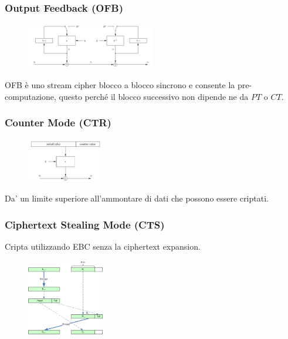 \documentclass[a4paper,12pt]{article}
\begin{document}
\subsubsection{Output Feedback (OFB)}
\begin{figure}[H]
  \centering
  \includegraphics[width=0.5\textwidth]{img/ofb}
\end{figure}
OFB è uno stream cipher blocco a blocco sincrono e consente la pre-computazione, questo perché il blocco successivo non dipende ne da $PT$ o $CT$.

\subsubsection{Counter Mode (CTR)}
\begin{figure}[H]
  \centering
  \includegraphics[width=0.3\textwidth]{img/ctr}
\end{figure}
Da' un limite superiore all'ammontare di dati che possono essere criptati.

\subsubsection{Ciphertext Stealing Mode (CTS)}
Cripta utilizzando EBC senza la ciphertext expansion.
\begin{figure}[H]
  \centering
  \includegraphics[width=0.3\textwidth]{img/cts}
\end{figure}
\end{document}
